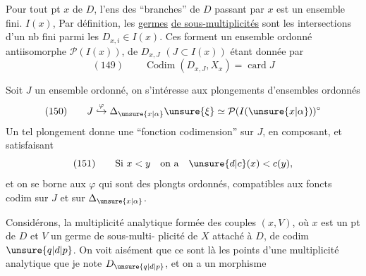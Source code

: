 Pour tout pt $x$ de $D$, l'ens des ``branches'' de $D$ passant par $x$ est un ensemble fini. $I(x)$, Par définition, les \uline{germes}  \uline{de sous-multiplicités}   sont les intersections d'un nb fini  parmi les $D_{x,i}\in I(x)$.
Ces  forment un ensemble ordonné  antiisomorphe  $\mathcal P(I(x))$,   de $D_{x,J}$ $(J\subset I(x))$ étant donnée par
\[
(149)\qquad \operatorname{Codim}(D_{x,J},X_x)=\operatorname{card}J
\]

Soit $J$ un ensemble ordonné, on s'intéresse aux plongements d'ensembles ordonnés
\[
(150)\qquad J\mathrel{\overset{\varphi}{\hookrightarrow}}\Delta_{\unsure{x|\alpha}}\unsure{\xi}\simeq\mathcal P(I(\unsure{x|\alpha}))^\circ
\]
Un tel plongement donne une ``fonction codimension'' sur $J$, en composant,  et  satisfaisant
\[
(151)\qquad\text{Si }x<y\quad\text{on a}\quad\unsure{d|c}(x)<c(y),
\]
et on se borne aux $\varphi$ qui sont des plongts ordonnés, compatibles aux foncts codim sur $J$ et sur $\Delta_{\unsure{x|\alpha}}$.

Considérons,  la multiplicité analytique formée des couples $(x,V)$, où $x$ est un pt de $D$ et $V$ un germe de sous-multi-
plicité de $X$ attaché à $D$, de codim $\unsure{q|d|p}$. On  voit aisément que ce sont  là les points d'une multiplicité analytique que je note $D_{\unsure{q|d|p}}$, et on a un morphisme
